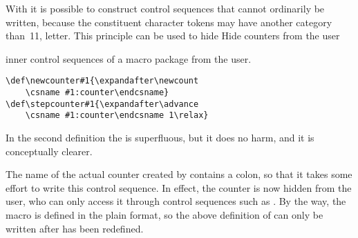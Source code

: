 With  it is possible to construct
control sequences that cannot ordinarily be written,
because the constituent character tokens may have another category
\alt
than~11, letter. This principle can be used to hide
\howto Hide counters from the user\par
inner control sequences of a macro package from the user.
\begin{example}
\begin{verbatim}
\def\newcounter#1{\expandafter\newcount
    \csname #1:counter\endcsname}
\def\stepcounter#1{\expandafter\advance
    \csname #1:counter\endcsname 1\relax}
\end{verbatim}
In the second definition the  is superfluous,
but it does no harm, and it is conceptually clearer.
\end{example}

The name of the actual counter created by 
contains a colon, so that it takes some effort to write this
control sequence. In effect, the counter
is now hidden from the user, who can only
access it through control sequences such as .
By the way, the macro  is defined  in
the plain format, so the above definition of 
can only be written after  has been redefined.

